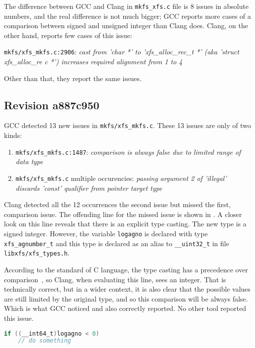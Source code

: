 The difference between GCC and Clang in {\tt mkfs\_xfs.c} file is 8 issues in
absolute numbers, and the real difference is not much bigger; GCC reports more
cases of a comparison between signed and unsigned integer than Clang does.
Clang, on the other hand, reports few cases of this issue:

{\tt mkfs/xfs\_mkfs.c:2906}: {\em cast from 'char *' to 'xfs\_alloc\_rec\_t *' (aka
'struct xfs\_alloc\_re    c *') increases required alignment from 1 to 4}

Other than that, they report the same issues.

\subsection{Revision a887c950}\label{chap:results:gcc:a887c950}
GCC detected 13 new issues in {\tt mkfs/xfs\_mkfs.c}. These 13 issues are only of two
kinds:
\begin{enumerate}
	\item {\tt mkfs/xfs\_mkfs.c:1487}: {\em comparison is always false due
		to limited range of data type}
	\item {\tt mkfs/xfs\_mkfs.c} multiple occurencies: {\em passing
		argument 2 of 'illegal' discards 'const' qualifier from
		pointer target type}
\end{enumerate}

Clang detected all the 12 occurrences the second issue but missed the first,
comparison issue. The offending line for the missed issue is shown in
. A closer look on this line reveals that
there is an explicit type casting. The new type is a signed integer. However,
the variable {\tt logagno} is declared with type {\tt xfs\_agnumber\_t} and
this type is declared as an alias to {\tt \_\_uint32\_t} in file {\tt
libxfs/xfs\_types.h}.

According to the standard of C language, the type casting has a precedence over
comparison~\cite[A.2.1]{ISO9899}, so Clang, when evaluating this line, sees
an integer. That is technically correct, but in a wider context, it is also
clear that the possible values are still limited by the original type, and
so this comparison will be always false.  Which is what GCC noticed and
also correctly reported. No other tool reported this issue.


\begin{lstlisting}[frame=none, basicstyle=\footnotesize\ttfamily,
language=C, numbers=none, numberstyle=\tiny\color{black},caption=
{Line on which GCC found the comparison issue.},
label={lst:results:logagnoComparison}]
if ((__int64_t)logagno < 0)
	// do something
\end{lstlisting}


